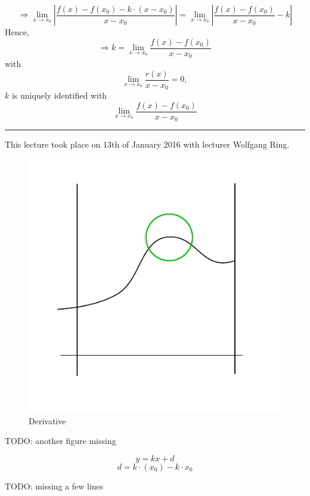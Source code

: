 \documentclass[a4paper,landscape,twocolumn]{article}
\theoremstyle{definition}
\newcommand\abs[1]{\left|#1\right|}
\newcommand\meta[3]{\hrule{} This #1 took place on #2 with lecturer #3.\par}
\begin{document}
\[
  \Rightarrow \lim_{x \to x_0}
  \abs{\frac{f(x) - f(x_0) - k \cdot (x - x_0)}{x - x_0}}
  = \lim_{x \to x_0} \abs{\frac{f(x) - f(x_0)}{x - x_0} - k}
\]
Hence,
\[
  \Rightarrow k = \lim_{x \to x_0} \frac{f(x) - f(x_0)}{x - x_0}
\]
with
\[ \lim_{x \to x_0} \frac{r(x)}{x - x_0} = 0, \]
$k$ is uniquely identified with
\[ \lim_{x \to x_0} \frac{f(x) - f(x_0)}{x - x_0} \]

\meta{lecture}{13th of January 2016}{Wolfgang Ring}

\begin{figure}[!h]
  \begin{center}
    \includegraphics{img/radius.pdf}
    \caption{Derivative}
    \label{img:deriv-radius}
  \end{center}
\end{figure}

TODO: another figure missing

\[ y = kx + d \]
\[ d = k \cdot(x_0) - k \cdot x_0 \]

TODO: missing a few lines
\end{document}
